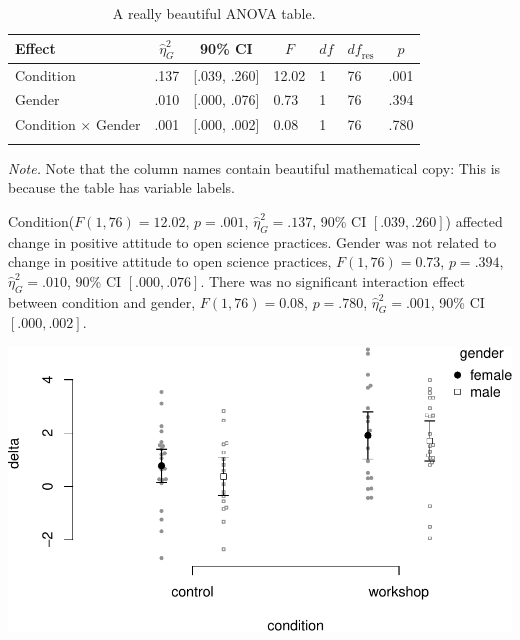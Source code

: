 \documentclass[
  man]{apa6}
\begin{document}
\begin{table}[tbp]

\begin{center}
\begin{threeparttable}

\caption{\label{tab:anova-example}A really beautiful ANOVA table.}

\begin{tabular}{lllllll}
\toprule
Effect & \multicolumn{1}{c}{$\hat{\eta}^2_G$} & \multicolumn{1}{c}{90\% CI} & \multicolumn{1}{c}{$F$} & \multicolumn{1}{c}{$\mathit{df}$} & \multicolumn{1}{c}{$\mathit{df}_{\mathrm{res}}$} & \multicolumn{1}{c}{$p$}\\
\midrule
Condition & .137 & {}[.039, .260] & 12.02 & 1 & 76 & .001\\
Gender & .010 & {}[.000, .076] & 0.73 & 1 & 76 & .394\\
Condition $\times$ Gender & .001 & {}[.000, .002] & 0.08 & 1 & 76 & .780\\
\bottomrule
\addlinespace
\end{tabular}

\begin{tablenotes}[para]
\normalsize{\textit{Note.} Note that the column names contain beautiful mathematical copy: This is because the table has variable labels.}
\end{tablenotes}

\end{threeparttable}
\end{center}

\end{table}

Condition(\(F(1, 76) = 12.02\), \(p = .001\), \(\hat{\eta}^2_G = .137\), 90\% CI \([.039, .260]\)) affected change in positive attitude to open science practices. Gender was not related to change in positive attitude to open science practices, \(F(1, 76) = 0.73\), \(p = .394\), \(\hat{\eta}^2_G = .010\), 90\% CI \([.000, .076]\). There was no significant interaction effect between condition and gender, \(F(1, 76) = 0.08\), \(p = .780\), \(\hat{\eta}^2_G = .001\), 90\% CI \([.000, .002]\).

\includegraphics{manuscript_files/figure-latex/beeplot-1.pdf}
\end{document}
